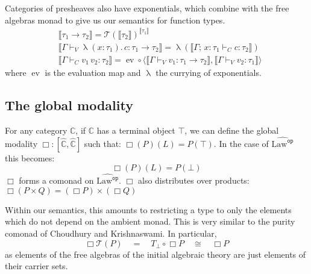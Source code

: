 \documentclass[acmsmall, screen, nonacm]{acmart}
\theoremstyle{definition}
\newcommand{\glob}{\mathop{\Box}}
\newcommand{\cat}{\mathbb{C}}
\newcommand{\psh}{\widehat{\cat}}
\newcommand{\terminal}{\top}
\newcommand{\initial}{\bot}
\newcommand{\lawc}{\mathrm{Law}}
\newcommand{\lawcop}{\lawc^{\mathtt{op}}}
\newcommand{\pshlawcop}{\widehat{\lawcop}}
\newcommand{\arrow}[2]{{#2}^{#1}}
\newcommand{\sem}[1]{\llbracket #1 \rrbracket}
\newcommand{\mon}{\mathcal{T}}
\newcommand{\abs}[3]{\mathop{\lambda}(#1 \types #2).\,#3}
\newcommand{\app}[2]{#1\,#2}
\newcommand{\types}{\mathrel{:}}
\newcommand{\ccons}[2]{#1;\,#2}
\newcommand{\lbind}[3]{\ccons{#1}{#2\types#3}}
\newcommand{\turnv}{\mathrel{\vdash_V}}
\newcommand{\turnc}{\mathrel{\vdash_C}}
\newcommand{\evmap}{\mathop{ev}}
\newcommand{\currymap}{\mathop{\lambda}}
\begin{document}
Categories of presheaves also have exponentials, which combine with the
free algebras monad to give us our semantics for function types.
\begin{align*}
  &\sem{\tau_1 \rightarrow \tau_2} = \arrow{\sem{\tau_1}}{\mon(\sem{\tau_2})} \\
  &\sem{\Gamma \turnv \abs{x}{\tau_1}{c} \types \tau_1 \rightarrow \tau_2} =
    \currymap(\sem{\lbind{\Gamma}{x}{\tau_1} \turnc c \types \tau_2})
     \\
  &\sem{\Gamma \turnc \app{v_1}{v_2} \types \tau_2} =
    \evmap
    \circ \langle \sem{\Gamma \turnv v_1 \types \tau_1 \rightarrow \tau_2},
                  \sem{\Gamma \turnv v_2 \types \tau_1} \rangle
\end{align*}
where $\evmap$ is the evaluation map and $\currymap$ the currying of
exponentials.

\subsection{The global modality}

For any category $\cat$, if $\cat$ has a terminal object $\terminal$, we
can define the global modality $\glob \types [\psh, \psh]$ such that:
$\glob(P)(L) = P(\terminal)$. In the case of $\pshlawcop$ this becomes:
\begin{equation*}
\glob(P)(L) = P(\initial)
\end{equation*}
$\glob$ forms a comonad on $\pshlawcop$. $\glob$ also distributes over
products: $\glob (P \times Q) = (\glob P) \times (\glob Q)$

Within our semantics, this amounts to restricting a type to only the
elements which do not depend on the ambient monad. This is very similar
to the purity comonad of Choudhury and
Krishnaswami\cite{choudhury2020recovering}. In particular,
\begin{equation*}
  \glob \mon(P) \quad = \quad T_{\initial} \circ \glob P
  \quad \cong \quad \glob P
\end{equation*}
as elements of the free algebras of the initial algebraic theory are
just elements of their carrier sets.
\end{document}
